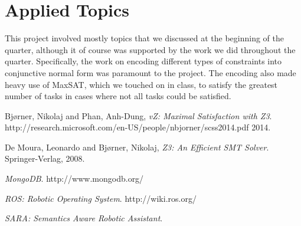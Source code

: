\documentclass[11pt]{article}
\begin{document}
\section{Applied Topics}
This project involved mostly topics
that we discussed at the beginning of the quarter,
although it of course was supported by
the work we did throughout the quarter.
Specifically, the work on encoding different types of constraints
into conjunctive normal form was paramount to the project.
The encoding also made heavy use of MaxSAT,
which we touched on in class,
to satisfy the greatest number of tasks
in cases where not all tasks could be satisfied.


\begin{thebibliography}{9}

  Bj{\o}rner, Nikolaj and Phan, Anh-Dung,
  \emph{vZ: Maximal Satisfaction with Z3}.
  http://research.microsoft.com/en-US/people/nbjorner/scss2014.pdf
  2014.

  De Moura, Leonardo and Bj{\o}rner, Nikolaj,
  \emph{Z3: An Efficient SMT Solver}.
  Springer-Verlag,
  2008.

  \emph{MongoDB}.
  http://www.mongodb.org/

  \emph{ROS: Robotic Operating System}.
  http://wiki.ros.org/

  \emph{SARA: Semantics Aware Robotic Assistant}.

\end{thebibliography}
\end{document}
